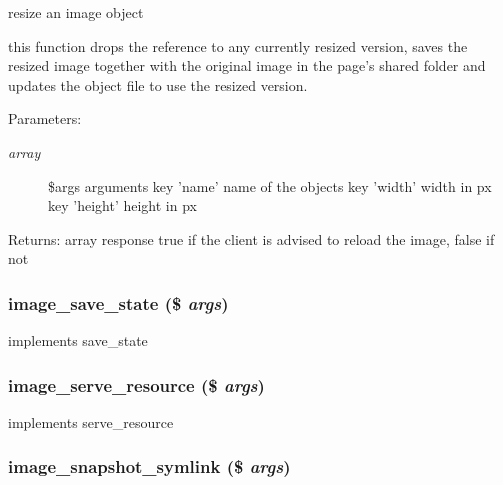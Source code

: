 resize an image object

this function drops the reference to any currently resized version, saves the resized image together with the original image in the page's shared folder and updates the object file to use the resized version. \begin{Desc}
\item[Parameters:]
\begin{description}
\item[{\em array}]\$args arguments key 'name' name of the objects key 'width' width in px key 'height' height in px \end{description}
\end{Desc}
\begin{Desc}
\item[Returns:]array response true if the client is advised to reload the image, false if not \end{Desc}
\hypertarget{module__image_8inc_8php_c26ea1448f0b7ed835907cf7c22b60ca}{
\subsubsection[{image\_\-save\_\-state}]{\setlength{\rightskip}{0pt plus 5cm}image\_\-save\_\-state (\$ {\em args})}}
\label{module__image_8inc_8php_c26ea1448f0b7ed835907cf7c22b60ca}


implements save\_\-state \hypertarget{module__image_8inc_8php_bb6646bfaa6a012e620cdaaa0bc3c807}{
\subsubsection[{image\_\-serve\_\-resource}]{\setlength{\rightskip}{0pt plus 5cm}image\_\-serve\_\-resource (\$ {\em args})}}
\label{module__image_8inc_8php_bb6646bfaa6a012e620cdaaa0bc3c807}


implements serve\_\-resource \hypertarget{module__image_8inc_8php_65d33fafe2da58d0f87f2df1fedbbe62}{
\subsubsection[{image\_\-snapshot\_\-symlink}]{\setlength{\rightskip}{0pt plus 5cm}image\_\-snapshot\_\-symlink (\$ {\em args})}}
\label{module__image_8inc_8php_65d33fafe2da58d0f87f2df1fedbbe62}


